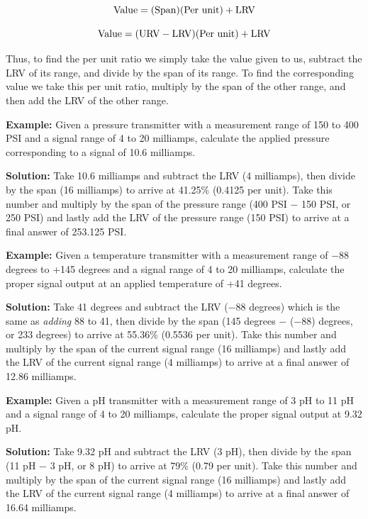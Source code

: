 $$\hbox{Value} = (\hbox{Span})(\hbox{Per unit}) + \hbox{LRV}$$

$$\hbox{Value} = (\hbox{URV} - \hbox{LRV})(\hbox{Per unit}) + \hbox{LRV}$$

Thus, to find the per unit ratio we simply take the value given to us, subtract the LRV of its range, and divide by the span of its range.  To find the corresponding value we take this per unit ratio, multiply by the span of the other range, and then add the LRV of the other range.

\vskip 20pt

\filbreak

\textbf{Example:} Given a pressure transmitter with a measurement range of 150 to 400 PSI and a signal range of 4 to 20 milliamps, calculate the applied pressure corresponding to a signal of 10.6 milliamps.

\textbf{Solution:} Take 10.6 milliamps and subtract the LRV (4 milliamps), then divide by the span (16 milliamps) to arrive at 41.25\% (0.4125 per unit).  Take this number and multiply by the span of the pressure range (400 PSI $-$ 150 PSI, or 250 PSI) and lastly add the LRV of the pressure range (150 PSI) to arrive at a final answer of 253.125 PSI.

\vskip 20pt

\textbf{Example:} Given a temperature transmitter with a measurement range of $-88$ degrees to +145 degrees and a signal range of 4 to 20 milliamps, calculate the proper signal output at an applied temperature of +41 degrees.

\textbf{Solution:} Take 41 degrees and subtract the LRV ($-88$ degrees) which is the same as \textit{adding} 88 to 41, then divide by the span (145 degrees $-$ ($-88$) degrees, or 233 degrees) to arrive at 55.36\% (0.5536 per unit).  Take this number and multiply by the span of the current signal range (16 milliamps) and lastly add the LRV of the current signal range (4 milliamps) to arrive at a final answer of 12.86 milliamps.

\vskip 20pt

\textbf{Example:} Given a pH transmitter with a measurement range of 3 pH to 11 pH and a signal range of 4 to 20 milliamps, calculate the proper signal output at 9.32 pH.

\textbf{Solution:} Take 9.32 pH and subtract the LRV (3 pH), then divide by the span (11 pH $-$ 3 pH, or 8 pH) to arrive at 79\% (0.79 per unit).  Take this number and multiply by the span of the current signal range (16 milliamps) and lastly add the LRV of the current signal range (4 milliamps) to arrive at a final answer of 16.64 milliamps.









